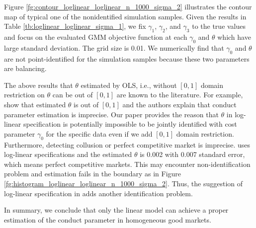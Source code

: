 \documentclass[11pt, a4paper]{article}
\begin{document}
Figure \ref{fg:contour_loglinear_loglinear_n_1000_sigma_2} illustrates the contour map of typical one of the nonidentified simulation samples. Given the results in Table \ref{tb:loglinear_loglinear_sigma_1}, we fix $\gamma_1$, $\gamma_2$, and $\gamma_3$ to the true values and focus on the evaluated GMM objective function at each $\gamma_0$ and $\theta$ which have large standard deviation. 
The grid size is 0.01.
We numerically find that $\gamma_0$ and $\theta$ are not point-identified for the simulation samples because these two parameters are balancing.

The above results that $\theta$ estimated by OLS, i.e., without $[0,1]$ domain restriction on $\theta$ can be out of $[0,1]$ are known to the literature. For example, \cite{okazaki2022excess} show that estimated $\theta$ is out of $[0,1]$ and the authors explain that conduct parameter estimation is imprecise. Our paper provides the reason that $\theta$ in log-linear specification is potentially impossible to be jointly identified with cost parameter $\gamma_0$ for the specific data even if we add $[0,1]$ domain restriction. Furthermore, detecting collusion or perfect competitive market is imprecise. \cite{merel2009measuring} uses log-linear specifications and the estimated $\theta$ is 0.002 with 0.007 standard error, which means perfect competitive markets. This may encounter non-identification problem and estimation fails in the boundary as in Figure \ref{fg:histogram_loglinear_loglinear_n_1000_sigma_2}. Thus, the suggestion of log-linear specification in \cite{perloff2012collinearity} adds another identification problem. 

In summary, we conclude that only the linear model can achieve a proper estimation of the conduct parameter in homogeneous good markets. 




\end{document}
